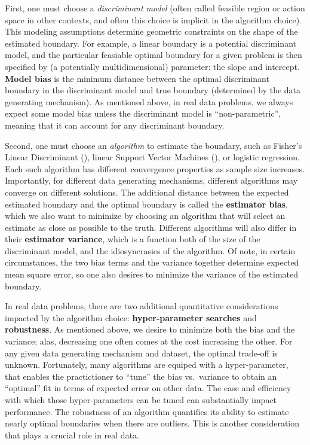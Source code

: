 \documentclass[10pt]{article}
\begin{document}


First, one must choose a \emph{discriminant model} (often called feasible region or action space in other contexts, and often this choice is implicit in the algorithm choice).
This modeling assumptions determine geometric constraints on the shape of the estimated boundary.
For example, a linear boundary is a potential discriminant model, and the particular feasiable optimal boundary for a given problem is then specified by (a potentially multidimensional) parameter: the slope and intercept.  \textbf{Model bias}  is the minimum distance between the optimal discriminant boundary in the discriminant model and true boundary (determined by the data generating mechanism).  As mentioned above, in real data problems, we always expect some model bias unless the discriminant model is ``non-parametric'', meaning that it can account for any discriminant boundary.

Second, one must choose an \emph{algorithm} to estimate the boundary, such as Fisher’s Linear Discriminant (\Fld), linear Support Vector Machines (\Svm), or logistic regression.  Each such algorithm has different convergence properties as sample size increases.  Importantly, for different data generating mechanisms, different algorithms may converge on different solutions.  The additional distance between the expected estimated boundary and the optimal boundary is called the \textbf{estimator bias}, which we also want to minimize by choosing an algorithm that will select an estimate as close as possible to the truth.  Different algorithms will also differ in their \textbf{estimator variance}, which is a function both of the size of the discriminant model, and the idiosyncrasies of the algorithm.  Of note, in certain circumstances, the two bias terms and the variance together determine expected mean square error, so one also desires to minimize the variance of the estimated boundary.

In real data problems, there are two additional quantitative considerations impacted by the algorithm choice: \textbf{hyper-parameter searches} and \textbf{robustness}. As mentioned above, we desire to minimize both the bias and the variance; alas, decreasing one often comes at the cost increasing the other.  For any given data generating mechanism and dataset, the optimal trade-off is unknown. Fortunately, many algorithms are equiped with a hyper-parameter, that enables the practictioner to ``tune'' the bias vs.~variance to obtain an ``optimal'' fit in terms of expected error on other data.  The ease and efficiency with which those hyper-parameters can be tuned can substantially impact performance.   The robustness of an algorithm quantifies its ability to estimate nearly optimal boundaries when there are outliers. This is another consideration that plays a crucial role in real data.
\end{document}
